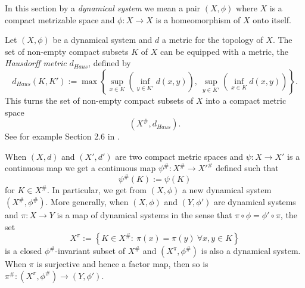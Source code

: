 \documentclass[12pt,oneside,english]{amsart}
\begin{document}
In this section by a \emph{dynamical system} we mean a pair $(X,\phi)$ where $X$ is a compact metrizable space and $\phi : X \to X$ is a homeomorphism of $X$ onto itself. 

Let $(X,\phi)$ be a dynamical system and $d$ a metric for the topology of $X$. The set of non-empty compact subsets $K$ of $X$ can be equipped with a metric, the \emph{Hausdorff metric} $d_{Haus}$, defined by
$$
d_{Haus}(K,K') := \max \left\{ \sup_{x \in K}\left(\inf_{y \in K'}d(x,y)\right), \  \sup_{y \in K'}\left(\inf_{x \in K}d(x,y)\right)\right\}.
$$
This turns the set of non-empty compact subsets of $X$ into a compact metric space 
$$(X^{\#},d_{Haus}).
$$
See for example Section 2.6 in \cite{B}.

When $(X,d)$ and $(X',d')$ are two compact metric spaces and $\psi : X \to X'$ is a continuous map we get a continuous map $\psi^{\#} : X^{\#} \to X'^{\#}$ defined such that
$$
\psi^{\#}(K) := \psi(K) 
$$ 
for $K \in X^\#$. In particular, we get from $(X,\phi)$ a new dynamical system $(X^{\#},\phi^\#)$. More generally, when $(X,\phi)$ and $(Y,\phi')$ are dynamical systems and $\pi : X \to Y$ is a map of dynamical systems in the sense that $\pi \circ \phi = \phi' \circ \pi$, the set
\begin{equation*}\label{23-06-25b}
X^\pi := \left\{ K \in X^{\#}: \ \pi(x) = \pi(y)\ \forall x,y \in K \right\} 
\end{equation*}
is a closed $\phi^\#$-invariant subset of $X^\#$ and $(X^\pi,\phi^\#)$ is also a dynamical system. When $\pi$ is surjective and hence a factor map, then so is $\pi^\# : (X^\pi,\phi^\#) \to (Y,\phi')$.


\end{document}
